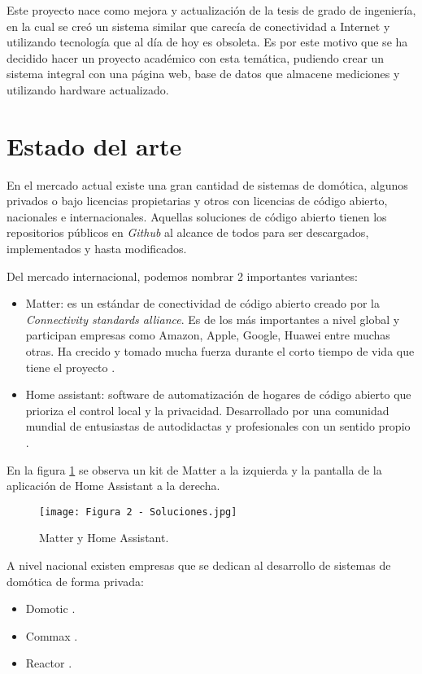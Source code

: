 Este proyecto nace como mejora y actualización de la tesis de grado de ingeniería, en la cual se creó un sistema similar que carecía de conectividad a Internet y utilizando tecnología que al día de hoy es obsoleta. Es por este motivo que se ha decidido hacer un proyecto académico con esta temática, pudiendo crear un sistema integral con una página web, base de datos que almacene mediciones y utilizando hardware actualizado.

\section{Estado del arte}

En el mercado actual existe una gran cantidad de sistemas de domótica, algunos privados o bajo licencias propietarias y otros con licencias de código abierto, nacionales e internacionales. Aquellas soluciones de código abierto tienen los repositorios públicos en \textit{Github} al alcance de todos para ser descargados, implementados y hasta modificados.

Del mercado internacional, podemos nombrar 2 importantes variantes:
\begin{itemize}
	\item Matter: es un estándar de conectividad de código abierto creado por la \textit{Connectivity standards alliance}. Es de los más importantes a nivel global y participan empresas como Amazon, Apple, Google, Huawei entre muchas otras. Ha crecido y tomado mucha fuerza durante el corto tiempo de vida que tiene el proyecto \citep{3}.
	\item Home assistant: software de automatización de hogares de código abierto que prioriza el control local y la privacidad. Desarrollado por una comunidad mundial de entusiastas de autodidactas y profesionales con un sentido propio \citep{4}.
\end{itemize}

En la figura \ref{fig:3} se observa un kit de Matter a la izquierda y la pantalla de la aplicación de Home Assistant a la derecha.

\begin{figure}[h]
\centering
\texttt{[image: Figura 2 - Soluciones.jpg]}
\caption[Matter y Home Assistant]{Matter y Home Assistant. \protect\footnotemark}
\label{fig:3}
\end{figure}

A nivel nacional existen empresas que se dedican al desarrollo de sistemas de domótica de forma privada:
\begin{itemize}
	\item Domotic \citep{5}.
	\item Commax \citep{6}.
	\item Reactor \citep{7}.
\end{itemize}

